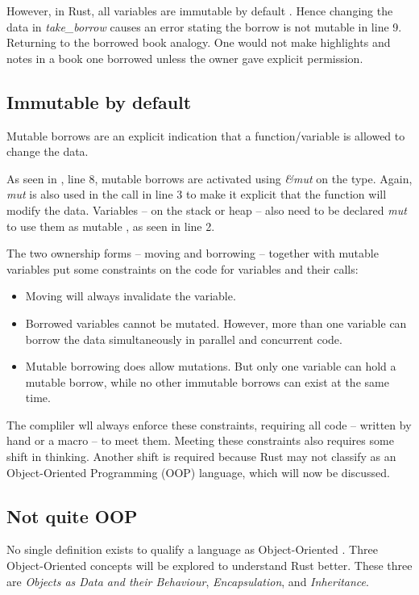 However, in Rust, all variables are immutable by default \cite{klabnik_2019_01}.
Hence changing the data in \textit{take\_borrow} causes an error stating the borrow is not mutable in line 9.
Returning to the borrowed book analogy.
One would not make highlights and notes in a book one borrowed unless the owner gave explicit permission.

\subsection{Immutable by default}
Mutable borrows are an explicit indication that a function/variable is allowed to change the data.


As seen in , line 8, mutable borrows are activated using \textit{\&mut } on the type.
Again, \textit{mut} is also used in the call in line 3 to make it explicit that the function will modify the data.
Variables -- on the stack or heap -- also need to be declared \textit{mut} to use them as mutable \cite{klabnik_2019_01}, as seen in line 2.

The two ownership forms -- moving and borrowing -- together with mutable variables put some constraints on the code for variables and their calls: \cite{klabnik_2019_01}
\begin{itemize}
	\item Moving will always invalidate the variable.
	\item Borrowed variables cannot be mutated.
	      However, more than one variable can borrow the data simultaneously in parallel and concurrent code.
	\item Mutable borrowing does allow mutations.
	      But only one variable can hold a mutable borrow, while no other immutable borrows can exist at the same time.
\end{itemize}

The compliler wll always enforce these constraints, requiring all code -- written by hand or a macro -- to meet them.
Meeting these constraints also requires some shift in thinking.
Another shift is required because Rust may not classify as an Object-Oriented Programming (OOP) language, which will now be discussed.

\subsection{Not quite OOP}
No single definition exists to qualify a language as Object-Oriented \cite{meyer_97_01,stefik_85_01,gamma_94_01,klabnik_2019_01}.
Three Object-Oriented concepts will be explored to understand Rust better.
These three are \textit{Objects as Data and their Behaviour}, \textit{Encapsulation}, and \textit{Inheritance}.

